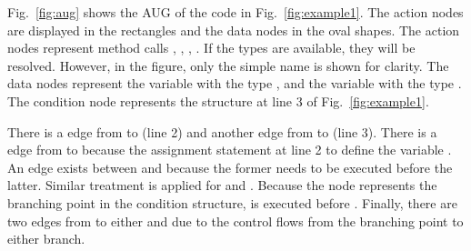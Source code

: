 Fig.~\ref{fig:aug} shows the AUG of the code in
Fig.~\ref{fig:example1}.  The action nodes are displayed in the
rectangles and the data nodes in the oval shapes. The action nodes
represent method calls ,
, ,
. If the types are available,
they will be resolved. However, in the figure, only the simple name is
shown for clarity. The data nodes represent the variable 
with the type , and the variable 
with the type . The condition node 
represents the  structure at line 3 of
Fig.~\ref{fig:example1}.

There is a  edge from  to
 (line 2) and another  edge
from  to  (line 3). There is a
 edge from  to
 because the assignment statement at line 2 to
define the variable . An  edge exists
between  and 
because the former needs to be executed before the latter. Similar
treatment is applied for  and
. Because the  node represents the
branching point in the condition structure,  is
executed before . Finally, there are two  edges
from  to either  and
 due to the control flows from the
branching point to either branch.

